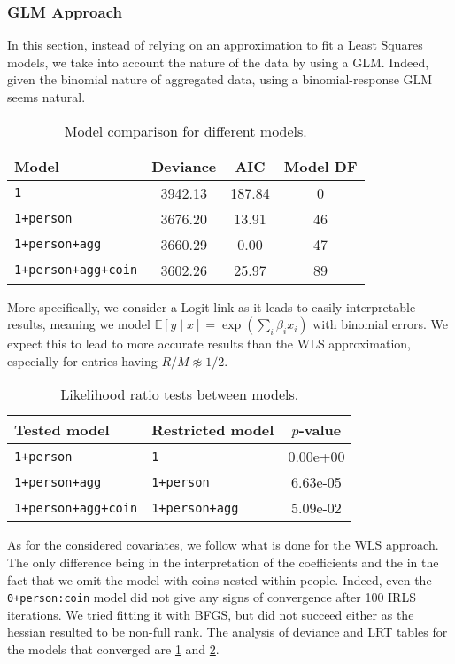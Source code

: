 \documentclass[a4paper, 12pt,oneside]{article}
\begin{document}
			\subsubsection{GLM Approach}
			In this section, instead of relying on an approximation to fit a Least Squares models, we take into account the nature of the data by using a GLM. Indeed, given the binomial nature of aggregated data, using a binomial-response GLM seems natural. 
			\begin{table}[htb]
				\centering
				\caption{Model comparison for different models.}
				\label{tab:model-comparison}
				\begin{tabular}{lccc}
				\toprule
				Model & Deviance & AIC & Model DF \\
				\midrule
				\texttt{1} & 3942.13 & 187.84 & 0 \\
				\texttt{1+person} & 3676.20 & 13.91 & 46 \\
				\texttt{1+person+agg} & 3660.29 & 0.00 & 47 \\
				\texttt{1+person+agg+coin} & 3602.26 & 25.97 & 89 \\
				\bottomrule
				\end{tabular}
			\end{table}
			More specifically, we consider a Logit link as it leads to easily interpretable results, meaning we model $\mathbb{E}[y\mid x]=\exp\left(\sum_i \beta_i x_i\right)$ with binomial errors. We expect this to lead to more accurate results than the WLS approximation, especially for entries having $R/M\not\approx 1/2$.
			\begin{table}[htb]
				\centering
				\caption{Likelihood ratio tests between models.}
				\label{tab:llr-comparison}
				\begin{tabular}{llc}
				\toprule
				Tested model & Restricted model & $p$-value \\
				\midrule
				\texttt{1+person} & \texttt{1} & 0.00e+00 \\
				\texttt{1+person+agg} & \texttt{1+person} & 6.63e-05 \\
				\texttt{1+person+agg+coin} & \texttt{1+person+agg} & 5.09e-02 \\
				\bottomrule
				\end{tabular}
			\end{table}
			As for the considered covariates, we follow what is done for the WLS approach. The only difference being in the interpretation of the coefficients and the in the fact that we omit the model with coins nested within people. Indeed, even the \texttt{0+person:coin} model did not give any signs of convergence after 100 IRLS iterations. We tried fitting it with BFGS, but did not succeed either as the hessian resulted to be non-full rank. The analysis of deviance and LRT tables for the models that converged are \ref{tab:model-comparison} and \ref{tab:llr-comparison}.
\end{document}
